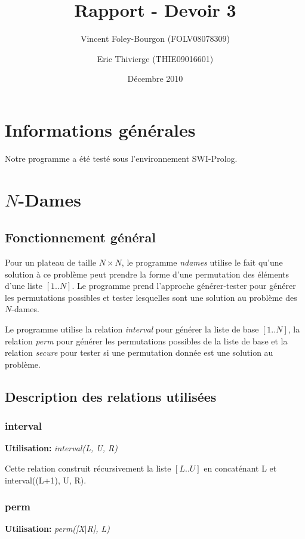 \documentclass[10pt]{article}
\newcommand{\usage}[1]{\textbf{Utilisation: }\emph{#1}}
\begin{document}
\title{Rapport - Devoir 3}
\date{Décembre 2010}
\author{Vincent Foley-Bourgon (FOLV08078309) \and
    Eric Thivierge (THIE09016601)}

\maketitle

\section{Informations générales}

Notre programme a été testé sous l'environnement SWI-Prolog.

\section{$N$-Dames}

\subsection{Fonctionnement général}

Pour un plateau de taille $N \times N$, le programme \emph{ndames}
utilise le fait qu'une solution à ce problème peut prendre la forme
d'une permutation des éléments d'une liste $[1..N]$. Le programme prend
l'approche générer-tester pour générer les permutations possibles et
tester lesquelles sont une solution au problème des $N$-dames.

Le programme utilise la relation \emph{interval} pour générer la liste
de base $[1..N]$, la relation \emph{perm} pour générer les permutations
possibles de la liste de base et la relation \emph{secure} pour tester
si une permutation donnée est une solution au problème.

\subsection{Description des relations utilisées}

\subsubsection{interval}
\usage{interval(L, U, R)}

Cette relation construit récursivement la liste $[L..U]$ en
concaténant L et interval((L+1), U, R).

\subsubsection{perm}
\usage{perm([X$|$R], L)}
\end{document}
